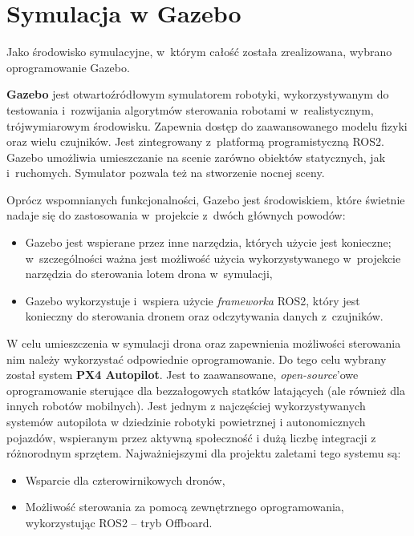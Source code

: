 \section{Symulacja w Gazebo}
\label{sec:sym_gazebo}

Jako środowisko symulacyjne, w~którym całość została zrealizowana, wybrano oprogramowanie Gazebo.


\textbf{Gazebo} jest otwartoźródłowym symulatorem robotyki, wykorzystywanym do testowania i~rozwijania algorytmów sterowania robotami w~realistycznym, trójwymiarowym środowisku. Zapewnia dostęp do zaawansowanego modelu fizyki oraz wielu czujników. Jest zintegrowany z~platformą programistyczną ROS2. Gazebo umożliwia umieszczanie na scenie zarówno obiektów statycznych, jak i~ruchomych. %
Symulator pozwala też na stworzenie nocnej sceny.

\vspace{11px}
\noindent Oprócz wspomnianych funkcjonalności, Gazebo jest środowiskiem, które świetnie nadaje się do zastosowania w~projekcie z~dwóch głównych powodów:
\begin{itemize}
    \item Gazebo jest wspierane przez inne narzędzia, których użycie jest konieczne; w~szczególności ważna jest możliwość użycia wykorzystywanego w~projekcie narzędzia do sterowania lotem drona w~symulacji,
    \item Gazebo wykorzystuje i~wspiera użycie \textit{frameworka} ROS2, który jest konieczny do sterowania dronem oraz odczytywania danych z~czujników.
\end{itemize}


W celu umieszczenia w symulacji drona oraz zapewnienia możliwości sterowania nim należy wykorzystać odpowiednie oprogramowanie. Do tego celu wybrany został system \textbf{PX4 Autopilot}. Jest to zaawansowane, \textit{open-source}'owe oprogramowanie sterujące dla bezzałogowych statków latających (ale również dla innych robotów mobilnych). Jest jednym z najczęściej wykorzystywanych systemów autopilota w dziedzinie robotyki powietrznej i autonomicznych pojazdów, wspieranym przez aktywną społeczność i dużą liczbę integracji z różnorodnym sprzętem. Najważniejszymi dla projektu zaletami tego systemu są:
\begin{itemize}
    \item Wsparcie dla czterowirnikowych dronów,
    \item Możliwość sterowania za pomocą zewnętrznego oprogramowania, wykorzystując ROS2 -- tryb Offboard.
\end{itemize}


